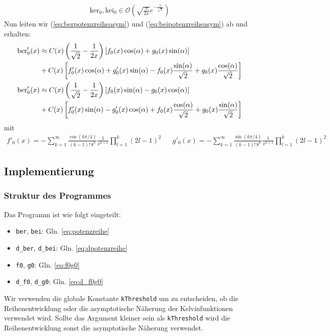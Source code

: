 \documentclass[10pt,a4paper]{article}
\begin{document}
\begin{align}
	\mathrm{ker}_0, \mathrm{kei}_0 \in \mathcal{O}\left( \sqrt{\frac{\pi}{2 x}}e^{-\frac{x}{\sqrt{2}}} \right)
\end{align}
Nun leiten wir (\ref{eq:berpotenzreiheasym}) und (\ref{eq:beipotenzreiheasym}) ab und erhalten:
\begin{align}
	\mathrm{ber}'_0(x) &\approx C(x) \left( \frac{1}{\sqrt{2}} - \frac{1}{2x} \right) \left[f_0(x) \cos(\alpha) + g_0(x) \sin(\alpha) \right] \notag\\ & + C(x) \left[ f'_0(x) \cos(\alpha) + g'_0(x) \sin(\alpha) - f_0(x) \frac{\sin(\alpha)}{\sqrt{2}} + g_0(x) \frac{\cos(\alpha)}{\sqrt{2}} \right]\label{eq:dberpotenzreiheasym}\\
	\mathrm{ber}'_0(x) &\approx C(x) \left( \frac{1}{\sqrt{2}} - \frac{1}{2x} \right) \left[f_0(x) \sin(\alpha) - g_0(x) \cos(\alpha) \right] \notag\\ & + C(x) \left[ f'_0(x) \sin(\alpha) - g'_0(x) \cos(\alpha) + f_0(x) \frac{\cos(\alpha)}{\sqrt{2}} + g_0(x) \frac{\sin(\alpha)}{\sqrt{2}} \right] \label{eq:dbeipotenzreiheasym}
\end{align}
mit
\begin{align}
	f'_0(x) = - \sum^{\infty}_{k=1} \frac{\cos(k \pi / 4)}{(k-1)! \, 8^k} \frac{1}{x^{k+1}} \prod^{k}_{l=1}(2l - 1)^2&&
	g'_0(x) = -\sum^{\infty}_{k=1} \frac{\sin(k \pi / 4)}{(k-1)! \, 8^k} \frac{1}{x^{k+1}} \prod^{k}_{l=1}(2l - 1)^2\label{eq:d_f0g0}
\end{align}

\subsection{Implementierung}

\subsubsection{Struktur des Programmes}
Das Programm ist wie folgt eingeteilt:
\begin{itemize}
\item \texttt{ber}, \texttt{bei}: Gln. \ref{eq:potenzreihe}
\item \texttt{d\_ber}, \texttt{d\_bei}: Gln. \ref{eq:dpotenzreihe}
\item \texttt{f0}, \texttt{g0}: Gln. \ref{eq:f0g0}
\item \texttt{d\_f0}, \texttt{d\_g0}: Gln. \ref{eq:d_f0g0}
\end{itemize}
Wir verwenden die globale Konstante \texttt{kThreshold} um zu entscheiden, ob die Reihenentwicklung oder die asymptotische Näherung der Kelvinfunktionen verwendet wird. Sollte das Argument kleiner sein als \texttt{kThreshold} wird die Reihenentwicklung sonst die asymptotische Näherung verwendet.
\end{document}
